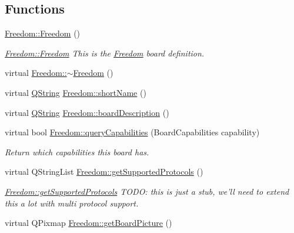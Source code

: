 \subsection*{\-Functions}
\begin{DoxyCompactItemize}
\item 
\hyperlink{group___boards___tau_labs_plugin_ga87f0c726ad13819e3918a3e270021fe9}{\-Freedom\-::\-Freedom} ()
\begin{DoxyCompactList}\small\item\em \hyperlink{group___boards___tau_labs_plugin_ga87f0c726ad13819e3918a3e270021fe9}{\-Freedom\-::\-Freedom} \-This is the \hyperlink{class_freedom}{\-Freedom} board definition. \end{DoxyCompactList}\item 
virtual \hyperlink{group___boards___tau_labs_plugin_ga877df717ce1cf3c223d88f54ba538092}{\-Freedom\-::$\sim$\-Freedom} ()
\item 
virtual \hyperlink{group___u_a_v_objects_plugin_gab9d252f49c333c94a72f97ce3105a32d}{\-Q\-String} \hyperlink{group___boards___tau_labs_plugin_ga430b08f4808aa122ae6f93fc1afd1ef5}{\-Freedom\-::short\-Name} ()
\item 
virtual \hyperlink{group___u_a_v_objects_plugin_gab9d252f49c333c94a72f97ce3105a32d}{\-Q\-String} \hyperlink{group___boards___tau_labs_plugin_ga7668e232716f9de134cbcbb2936fda15}{\-Freedom\-::board\-Description} ()
\item 
virtual bool \hyperlink{group___boards___tau_labs_plugin_ga9fe63b3e3b843bb34144942f4faafa3f}{\-Freedom\-::query\-Capabilities} (\-Board\-Capabilities capability)
\begin{DoxyCompactList}\small\item\em \-Return which capabilities this board has. \end{DoxyCompactList}\item 
virtual \-Q\-String\-List \hyperlink{group___boards___tau_labs_plugin_ga0666d1e73c1b7042303e2804c849420d}{\-Freedom\-::get\-Supported\-Protocols} ()
\begin{DoxyCompactList}\small\item\em \hyperlink{group___boards___tau_labs_plugin_ga0666d1e73c1b7042303e2804c849420d}{\-Freedom\-::get\-Supported\-Protocols} \-T\-O\-D\-O\-: this is just a stub, we'll need to extend this a lot with multi protocol support. \end{DoxyCompactList}\item 
virtual \-Q\-Pixmap \hyperlink{group___boards___tau_labs_plugin_ga07d3982d49c35a87baa85e32af63e49c}{\-Freedom\-::get\-Board\-Picture} ()

\end{DoxyCompactItemize}
